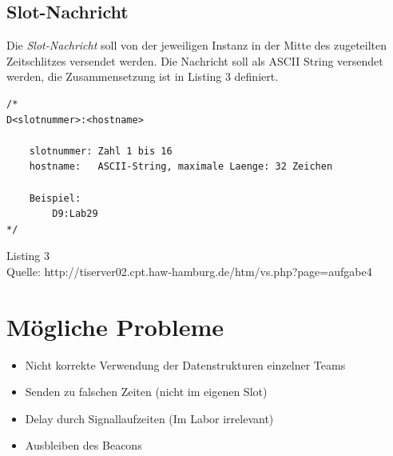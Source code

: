 \documentclass{article}
\begin{document}
\newpage
\subsection{Slot-Nachricht}
Die \textit{Slot-Nachricht} soll von der jeweiligen Instanz in der Mitte des zugeteilten Zeitschlitzes versendet werden. Die Nachricht soll als ASCII String versendet werden, die Zusammensetzung ist in Listing 3 definiert.

\begin{center}
\begin{lstlisting}
/*
D<slotnummer>:<hostname>

    slotnummer: Zahl 1 bis 16
    hostname:   ASCII-String, maximale Laenge: 32 Zeichen

    Beispiel:
        D9:Lab29
*/
\end{lstlisting}
\tiny Listing 3\\
\tiny Quelle: http://tiserver02.cpt.haw-hamburg.de/htm/vs.php?page=aufgabe4
\end{center}

\section{Mögliche Probleme}
\begin{itemize}
	\item Nicht korrekte Verwendung der Datenstrukturen einzelner Teams
	\item Senden zu falschen Zeiten (nicht im eigenen Slot)
	\item Delay durch Signallaufzeiten (Im Labor irrelevant)
	\item Ausbleiben des Beacons
\end{itemize}
\end{document}

